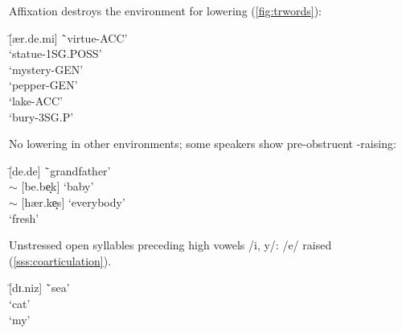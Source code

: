 \begin{example}\label{ex:trresyll}
Affixation destroys the environment for lowering (\cref{fig:trwords}):
  \begin{tabbing}
       \tab[2cm] \= [ær.de.mi] \tab[3cm] \=`virtue-{\sc\scriptsize ACC}' \\
        \>`statue-{\sc\scriptsize 1SG.POSS}' \\
       \> [gi.ze.min] \>`mystery-{\sc\scriptsize GEN}'\\
       \> [bi.be.rin] \>`pepper-{\sc\scriptsize GEN}'\\
       \> [g\o .ly] \>`lake-{\sc\scriptsize ACC}'\\
       \> [g\o .m\ae r] \>`bury-{\sc\scriptsize 3SG.P}'
  \end{tabbing}
\end{example}

\begin{example}\label{ex:trother}
No lowering in other environments; some speakers show pre-obstruent -raising:
  \begin{tabbing}
       \tab[2cm] \= [de.de] \tab[3cm] \=`grandfather' \\
       \> [be.bek] $\sim$ [be.be̝k] \>`baby' \\
       \> [h\ae r.kes] $\sim$ [h\ae r.ke̝s] \>`everybody'\\
       \> [ta.ze] \>`fresh'
  \end{tabbing}
\end{example}

\begin{example}\label{ex:trheightharmony}
Unstressed open syllables preceding high vowels /i, y/: /e/ raised (\cref{sss:coarticulation}).
  \begin{tabbing}
       \tab[2cm] \= [dɪ.niz] \tab[3cm] \=`sea' \\
       \> [kɪ.di] \>`cat' \\
       \> [bɪ.nim] \>`my'
  \end{tabbing}
\end{example}

